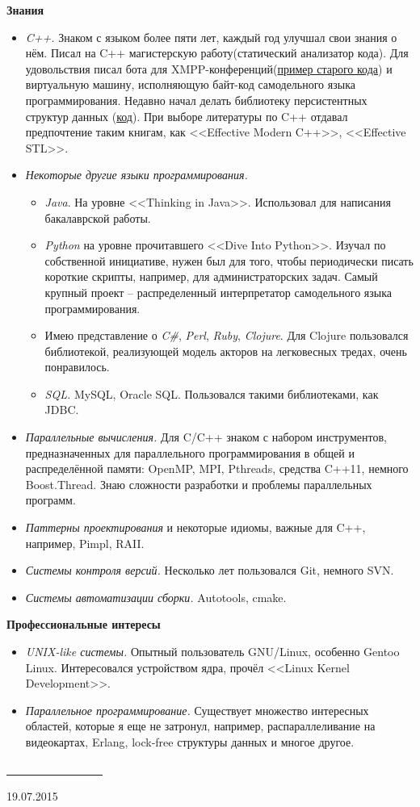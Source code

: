 \documentclass[final]{letter}
\begin{document}
{\bf Знания}
\begin {itemize}
\item \textit{C++.} Знаком с языком более пяти лет, каждый год улучшал свои знания о нём. Писал на C++ магистерскую работу(статический анализатор кода). Для удовольствия писал 
бота для XMPP-конференций(\href{https://github.com/neexee/neexee/blob/master/src/module/smart/smartmodule.cpp}{пример старого кода}) и виртуальную машину, исполняющую байт-код самодельного языка программирования.
Недавно начал делать библиотеку персистентных структур данных (\href{https://github.com/neexee/persist}{код}).
При выборе литературы по C++ отдавал предпочтение таким книгам, как <<Effective Modern C++>>, <<Effective STL>>.
\item \textit{Некоторые другие языки программирования.}
\begin{itemize}
\item \textit{Java}. На уровне <<Thinking in Java>>. Использовал для написания бакалаврской работы.
\item \textit{Python} на уровне прочитавшего <<Dive Into Python>>.
Изучал по собственной инициативе, нужен был для того, чтобы периодически писать короткие скрипты, например, для администраторских задач. Самый крупный проект -- распределенный интерпретатор
самодельного языка программирования.
\item Имею представление о \textit{C\#}, \textit{Perl}, \textit{Ruby}, \textit{Clojure}. Для Clojure пользовался библиотекой, реализующей модель акторов на легковесных тредах, очень понравилось.
\item \textit{SQL.} MySQL, Oracle SQL. Пользовался такими библиотеками, как JDBC.
\end{itemize}
\item \textit{Параллельные вычисления.} Для C/C++ знаком с набором инструментов, предназначенных для параллельного программирования в общей и распределённой памяти:
OpenMP, MPI, Pthreads, средства C++11, немного Boost.Thread. Знаю сложности разработки и проблемы параллельных программ.
\item \textit{Паттерны проектирования} и некоторые идиомы, важные для C++, например, Pimpl, RAII.
\item \textit{Системы контроля версий.} Несколько лет пользовался Git, немного SVN.
\item \textit{Системы автоматизации сборки.} Autotools, cmake.

\end{itemize}

{\bf Профессиональные интересы}
\begin {itemize}
\item \textit{UNIX-like системы.} Опытный пользователь GNU/Linux, особенно Gentoo Linux. Интересовался устройством ядра, прочёл <<Linux Kernel Development>>.
\item \textit{Параллельное программирование.} Существует множество интересных областей, которые я еще не затронул, например, распараллеливание на видеокартах, Erlang, lock-free структуры данных и многое другое.
\end{itemize}

\vfill
\begin{center}
\underline{~~~~~~~~~~~~~~~~~}

19.07.2015
\end{center}
\end{document}
